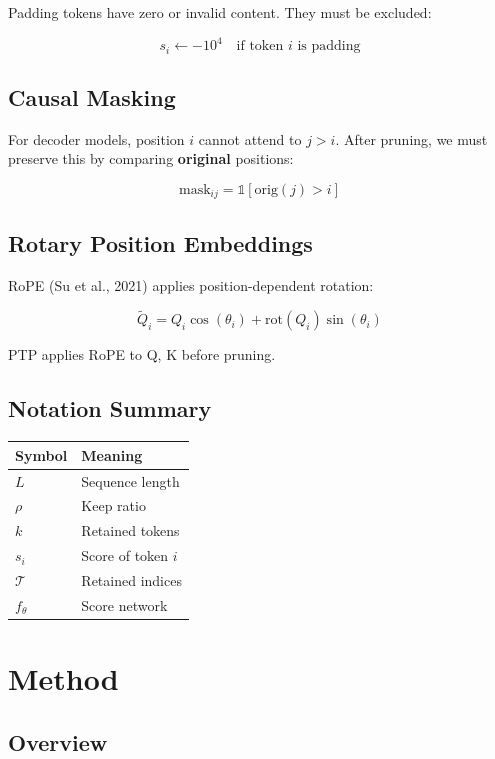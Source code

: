 Padding tokens have zero or invalid content. They must be excluded:

\[
s_i \leftarrow -10^4 \quad \text{if token } i \text{ is padding}
\tag{3.6}
\]

\subsection{Causal Masking}

For decoder models, position $i$ cannot attend to $j > i$. After pruning, 
we must preserve this by comparing \textbf{original} positions:

\[
\text{mask}_{ij} = \mathbb{1}[\text{orig}(j) > i]
\tag{3.7}
\]

\subsection{Rotary Position Embeddings}

RoPE (Su et al., 2021) applies position-dependent rotation:

\[
\tilde{Q}_i = Q_i \cos(\theta_i) + \text{rot}(Q_i) \sin(\theta_i)
\tag{3.8}
\]

PTP applies RoPE to Q, K before pruning.

\subsection{Notation Summary}

\begin{table}[H]
\centering
\small
\begin{tabular}{ll}
\toprule
\textbf{Symbol} & \textbf{Meaning} \\
\midrule
$L$ & Sequence length \\
$\rho$ & Keep ratio \\
$k$ & Retained tokens \\
$s_i$ & Score of token $i$ \\
$\mathcal{T}$ & Retained indices \\
$f_\theta$ & Score network \\
\bottomrule
\end{tabular}
\end{table}




\section{Method}

\subsection{Overview}

